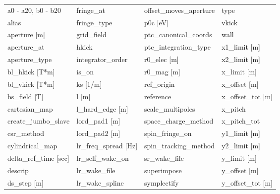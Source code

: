  \begin{tabular}{llll} \toprule
a0 - a20, b0 - b20             & fringe_at                      & offset_moves_aperture          & type                           \\
alias                          & fringe_type                    & p0c [eV]                       & vkick                          \\
aperture [m]                   & grid_field                     & ptc_canonical_coords           & wall                           \\
aperture_at                    & hkick                          & ptc_integration_type           & x1_limit [m]                   \\
aperture_type                  & integrator_order               & r0_elec [m]                    & x2_limit [m]                   \\
bl_hkick [T*m]                 & is_on                          & r0_mag [m]                     & x_limit [m]                    \\
bl_vkick [T*m]                 & ks [1/m]                       & ref_origin                     & x_offset [m]                   \\
bs_field [T]                   & l [m]                          & reference                      & x_offset_tot [m]               \\
cartesian_map                  & l_hard_edge [m]                & scale_multipoles               & x_pitch                        \\
create_jumbo_slave             & lord_pad1 [m]                  & space_charge_method            & x_pitch_tot                    \\
csr_method                     & lord_pad2 [m]                  & spin_fringe_on                 & y1_limit [m]                   \\
cylindrical_map                & lr_freq_spread [Hz]            & spin_tracking_method           & y2_limit [m]                   \\
delta_ref_time [sec]           & lr_self_wake_on                & sr_wake_file                   & y_limit [m]                    \\
descrip                        & lr_wake_file                   & superimpose                    & y_offset [m]                   \\
ds_step [m]                    & lr_wake_spline                 & symplectify                    & y_offset_tot [m]               \\

\end{tabular}
